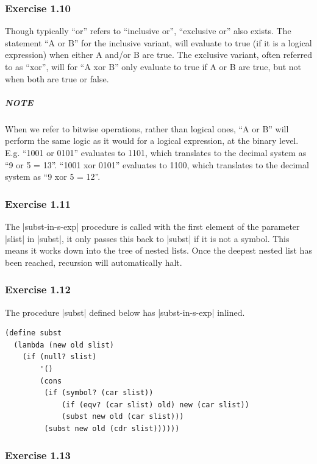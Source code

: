 \documentclass[a4paper]{article}
\begin{document}
\subsubsection{Exercise 1.10}

Though typically ``or'' refers to ``inclusive or'', ``exclusive or'' also exists. The statement ``A or B'' for the inclusive variant, will evaluate to true (if it is a logical expression) when either A and/or B are true. The exclusive variant, often referred to as ``xor'', will for ``A xor B'' only evaluate to true if A or B are true, but not when both are true or false.

\subparagraph{NOTE} When we refer to bitwise operations, rather than logical ones, ``A or B'' will perform the same logic as it would for a logical expression, at the binary level. E.g. ``1001 or 0101'' evaluates to 1101, which translates to the decimal system as ``9 or 5 = 13''. ``1001 xor 0101'' evaluates to 1100, which translates to the decimal system as ``9 xor 5 = 12''.

\subsubsection{Exercise 1.11}

The |subst-in-s-exp| procedure is called with the first element of the parameter |slist| in |subst|, it only passes this back to |subst| if it is not a symbol. This means it works down into the tree of nested lists. Once the deepest nested list has been reached, recursion will automatically halt.

\subsubsection{Exercise 1.12}

The procedure |subst| defined below has |subst-in-s-exp| inlined.

\begin{lstlisting}
(define subst
  (lambda (new old slist)
    (if (null? slist)
        '()
        (cons
         (if (symbol? (car slist))
             (if (eqv? (car slist) old) new (car slist))
             (subst new old (car slist)))
         (subst new old (cdr slist))))))
\end{lstlisting}

\subsubsection{Exercise 1.13}
\end{document}
